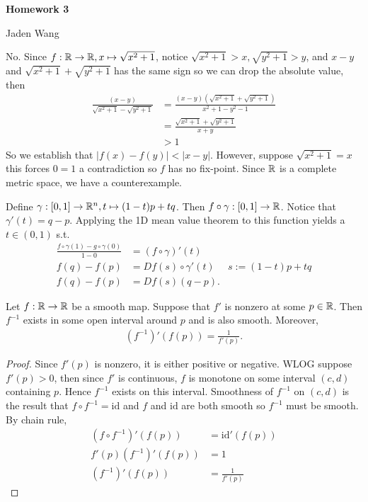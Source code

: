 \documentclass[12pt]{article}
\begin{document}
\centerline {\textsf{\textbf{\LARGE{Homework 3}}}}
\centerline {Jaden Wang}
\vspace{.15in}

\begin{problem}[6.5]
No. Since $ f: \mathbb{R} \to \mathbb{R}, x \mapsto \sqrt{x^2+1}$, notice $ \sqrt{x^2+1} > x, \sqrt{y^2+1} >y$, and $ x-y$ and  $ \sqrt{x^2+1} + \sqrt{y^2+1}$ has the same sign so we can drop the absolute value, then
\begin{align*}
	\frac{(x-y)}{ \sqrt{x^2+1} - \sqrt{y^2+1} } &= \frac{(x-y)(\sqrt{x^2+1}+ \sqrt{y^2+1})}{ x^2+1 - y^2 - 1} \\
	&= \frac{\sqrt{x^2+1} + \sqrt{y^2+1}}{ x+y} \\
	&> 1
\end{align*}
So we establish that $| f(x) - f(y) | < |x-y|$. However, suppose $\sqrt{x^2+1}  = x $ this forces $ 0=1$ a contradiction so  $ f$ has no fix-point. Since  $ \mathbb{R}$ is a complete metric space, we have a counterexample.
\end{problem}

\begin{problem}[6.7]
	Define $ \gamma: [0,1] \to \mathbb{R}^{n}, t \mapsto (1-t)p+tq$. Then $ f \circ \gamma: [0,1] \to \mathbb{R}$. Notice that $ \gamma'(t) = q-p$. Applying the 1D mean value theorem to this function yields a $ t \in (0,1)$ s.t.\ 
	\begin{align*}
		\frac{f \circ \gamma (1) - g \circ \gamma (0) }{ 1-0} &= (f \circ \gamma)'(t)\\
		f(q) - f(p)&= Df(s) \circ \gamma'(t) & s:= (1-t)p+tq \\
		f(q) - f(p) &= Df(s) (q-p).
	\end{align*}
\end{problem}

\begin{problem}[6.10]
\begin{thm}
Let $ f: \mathbb{R} \to \mathbb{R}$ be a smooth map. Suppose that $ f'$ is nonzero at some $ p \in \mathbb{R}$. Then $ f^{-1}$ exists in some open interval around $ p$ and is also smooth. Moreover,
\begin{align*}
	(f^{-1})'(f(p)) = \frac{1}{f'(p)}.
\end{align*}
\end{thm}
\begin{proof}
Since $ f'(p)$ is nonzero, it is either positive or negative. WLOG suppose $ f'(p)>0$, then since $ f'$ is continuous, $ f$ is monotone on  some interval $ (c, d)$ containing $ p$. Hence $ f^{-1}$ exists on this interval. Smoothness of $ f ^{-1}$ on $ (c,d)$ is the result that $ f \circ f ^{-1} = \text{id} $ and $ f$ and  $ \text{id} $ are both smooth so $ f^{-1}$ must be smooth. By chain rule,
\begin{align*}
	(f \circ f^{-1})'(f(p)) &= \text{id}'(f(p))  \\
	f'(p) (f^{-1})'(f(p))&= 1 \\
	(f^{-1})'(f(p)) &= \frac{1}{f'(p)} 
\end{align*}
\end{proof}
\end{problem}
\end{document}
